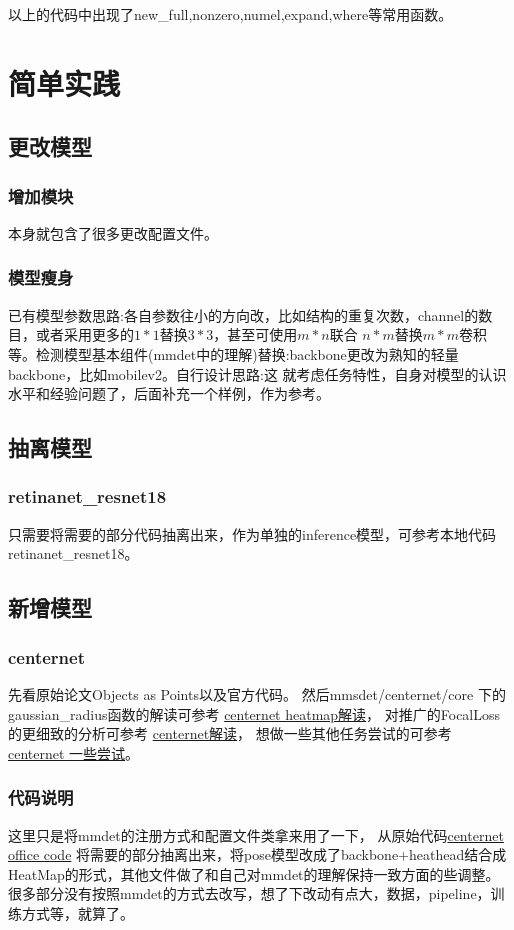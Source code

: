 \documentclass[UTF8]{ctexart}
\begin{document}
以上的代码中出现了new\_full,nonzero,numel,expand,where等常用函数。


\section{简单实践}
\subsection{更改模型}
\subsubsection{增加模块}
本身就包含了很多更改配置文件。
\subsubsection{模型瘦身}
已有模型参数思路:各自参数往小的方向改，比如结构的重复次数，channel的数目，或者采用更多的$1*1$替换$3*3$，甚至可使用$m*n $联合
$n*m$替换$m*m$卷积等。检测模型基本组件(mmdet中的理解)替换:backbone更改为熟知的轻量backbone，比如mobilev2。自行设计思路:这
就考虑任务特性，自身对模型的认识水平和经验问题了，后面补充一个样例，作为参考。


\subsection{抽离模型}
\subsubsection{retinanet\_resnet18}
只需要将需要的部分代码抽离出来，作为单独的inference模型，可参考本地代码retinanet\_resnet18。

\subsection{新增模型}
\subsubsection{centernet}
\label{sub:centernet}
先看原始论文Objects as Points以及官方代码。
然后mmsdet/centernet/core 下的gaussian\_radius函数的解读可参考
\href{https://zhuanlan.zhihu.com/p/96856635}{centernet heatmap解读}，
对推广的FocalLoss的更细致的分析可参考
\href{https://zhuanlan.zhihu.com/p/66048276}{centernet解读}，
想做一些其他任务尝试的可参考
\href{https://zhuanlan.zhihu.com/p/76378871}{centernet 一些尝试}。

\subsubsection{代码说明}
这里只是将mmdet的注册方式和配置文件类拿来用了一下，
从原始代码\href{https://github.com/xingyizhou/CenterNet}{centernet office code}
将需要的部分抽离出来，将pose模型改成了backbone+heathead结合成HeatMap的形式，其他文件做了和自己对mmdet的理解保持一致方面的些调整。
很多部分没有按照mmdet的方式去改写，想了下改动有点大，数据，pipeline，训练方式等，就算了。
\end{document}
